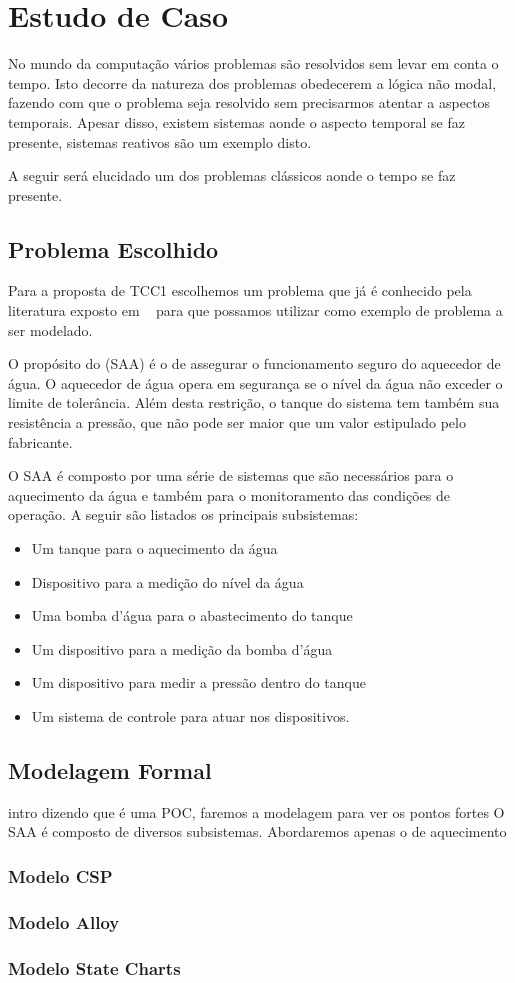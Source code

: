 \section{Estudo de Caso}
No mundo da computação vários problemas são resolvidos sem levar em conta o tempo.
Isto decorre da natureza dos problemas obedecerem a lógica não modal, fazendo com que o
problema seja resolvido sem precisarmos atentar a aspectos temporais. Apesar disso,
existem sistemas aonde o aspecto temporal se faz presente, sistemas reativos são um exemplo disto.

A seguir será elucidado um dos problemas clássicos aonde o tempo se faz presente.
\subsection{Problema Escolhido}
Para a proposta de TCC1 escolhemos um problema que já é conhecido pela literatura exposto
em ~\cite{opac-b1092561} para que possamos utilizar como exemplo de problema a ser modelado.

O propósito do  (SAA) é o de assegurar o funcionamento
seguro do aquecedor de água. O aquecedor de água opera em segurança se o nível da água
não exceder o limite de tolerância. Além desta restrição, o tanque do sistema tem também
sua resistência a pressão, que não pode ser maior que um valor estipulado pelo fabricante.

O SAA é composto por uma série de sistemas que são necessários para o aquecimento da água e também
para o monitoramento das condições de operação. A seguir são listados os principais subsistemas:
\begin{itemize}
\item Um tanque para o aquecimento da água
\item Dispositivo para a medição do nível da água
\item Uma bomba d'água para o abastecimento do tanque
\item Um dispositivo para a medição da bomba d'água
\item Um dispositivo para medir a pressão dentro do tanque
\item Um sistema de controle para atuar nos dispositivos.
\end{itemize}

\subsection{Modelagem Formal}
intro dizendo que é uma POC, faremos a modelagem para ver os pontos fortes
O SAA é composto de diversos subsistemas. Abordaremos apenas o de aquecimento
\subsubsection{Modelo CSP}
\subsubsection{Modelo Alloy}
\subsubsection{Modelo State Charts}
